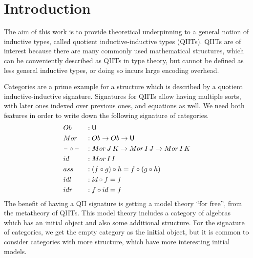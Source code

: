 \documentclass[sigplan,review,anonymous]{acmart}\settopmatter{printfolios=true,printccs=false,printacmref=false}
\begin{document}
\section{Introduction}

The aim of this work is to provide theoretical underpinning to a general notion
of inductive types, called quotient inductive-inductive types (QIITs). QIITs are
of interest because there are many commonly used mathematical structures, which
can be conveniently described as QIITs in type theory, but cannot be defined as
less general inductive types, or doing so incurs large encoding overhead.

Categories are a prime example for a structure which is described by a
quotient inductive-inductive signature. Signatures for QIITs allow
having multiple sorts, with later ones indexed over previous ones, and
equations as well. We need both features in order to write down the
following signature of categories.
\begin{alignat*}{3}
  & Ob  && : \mathsf{U} \\
  & Mor && : Ob\rightarrow Ob\rightarrow\mathsf{U} \\
  & \mathord{\hspace{1pt}\text{--}\hspace{1pt}}\circ\mathord{\hspace{1pt}\text{--}\hspace{1pt}} && : Mor\,J\,K\rightarrow Mor\,I\,J\rightarrow Mor\,I\,K \\
  & id && : Mor\,I\,I \\
  & ass && : (f\circ g)\circ h = f\circ(g\circ h) \\
  & idl && : id\circ f = f \\
  & idr && : f\circ id = f
\end{alignat*}
The benefit of having a QII signature is getting a model theory ``for free'',
from the metatheory of QIITs. This model theory includes a category of algebras
which has an initial object and also some additional structure. For the
signature of categories, we get the empty category as the initial object, but it
is common to consider categories with more structure, which have more
interesting initial models.
\end{document}
